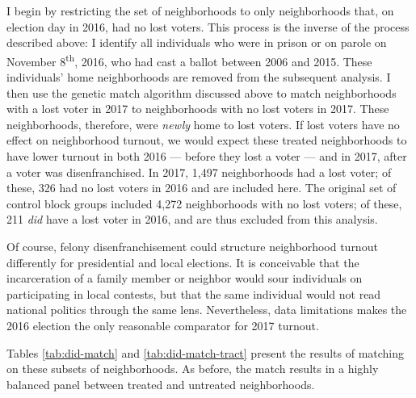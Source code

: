 \documentclass[
  12pt,
]{article}
\begin{document}
I begin by restricting the set of neighborhoods to only neighborhoods that, on election day in 2016, had no lost voters. This process is the inverse of the process described above: I identify all individuals who were in prison or on parole on November 8\textsuperscript{th}, 2016, who had cast a ballot between 2006 and 2015. These individuals' home neighborhoods are removed from the subsequent analysis. I then use the genetic match algorithm discussed above to match neighborhoods with a lost voter in 2017 to neighborhoods with no lost voters in 2017. These neighborhoods, therefore, were \emph{newly} home to lost voters. If lost voters have no effect on neighborhood turnout, we would expect these treated neighborhoods to have lower turnout in both 2016 --- before they lost a voter --- and in 2017, after a voter was disenfranchised. In 2017, 1,497 neighborhoods had a lost voter; of these, 326 had no lost voters in 2016 and are included here. The original set of control block groups included 4,272 neighborhoods with no lost voters; of these, 211 \emph{did} have a lost voter in 2016, and are thus excluded from this analysis.

Of course, felony disenfranchisement could structure neighborhood turnout differently for presidential and local elections. It is conceivable that the incarceration of a family member or neighbor would sour individuals on participating in local contests, but that the same individual would not read national politics through the same lens. Nevertheless, data limitations makes the 2016 election the only reasonable comparator for 2017 turnout.

Tables \ref{tab:did-match} and \ref{tab:did-match-tract} present the results of matching on these subsets of neighborhoods. As before, the match results in a highly balanced panel between treated and untreated neighborhoods.
\end{document}
